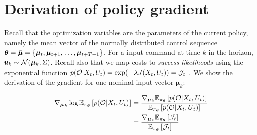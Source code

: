 \section{Derivation of policy gradient}\label{sec:app_derivation_policy_gradient}
Recall that the optimization variables are the parameters of the current policy, namely the mean vector of the normally distributed control sequence $\boldsymbol{\theta} = \bar{\boldsymbol{\mu}} = \{\boldsymbol{\mu}_t,  \boldsymbol{\mu}_{t+1}, \dots, \boldsymbol{\mu}_{t+T-1} \}$. For a input command at time $k$ in the horizon, $\pmb{u}_k \sim \mathcal{N}(\boldsymbol{\mu}_k, \Sigma)$. Recall also that we map costs to \emph{success likelihoods} using the exponential function $p(\mathcal{O} | X_t, U_t) = \exp(-\lambda J(X_t, U_t)) = \mathcal{J}_t$ . We show the derivation of the gradient for one nominal input vector $\boldsymbol{\mu}_k$:

\begin{align}
    \nabla_{\boldsymbol{\mu}_k} \log \mathbb{E}_{\pi_{\boldsymbol{\theta}}} \left [p(\mathcal{O} | X_t, U_t)\right]
    &= \frac{\nabla_{\boldsymbol{\mu}_k} \mathbb{E}_{\pi_{\boldsymbol{\theta}}} \left [p(\mathcal{O} | X_t, U_t)\right]}{\mathbb{E}_{\pi_{\boldsymbol{\theta}}} \left [p(\mathcal{O} | X_t, U_t)\right]} \\
    &= \frac{\nabla_{\boldsymbol{\mu}_k} \mathbb{E}_{\pi_{\boldsymbol{\theta}}} \left [\mathcal{J}_t\right]}{\mathbb{E}_{\pi_{\boldsymbol{\theta}}} \left [\mathcal{J}_t\right]} \label{eq:log_gradient}
\end{align}

